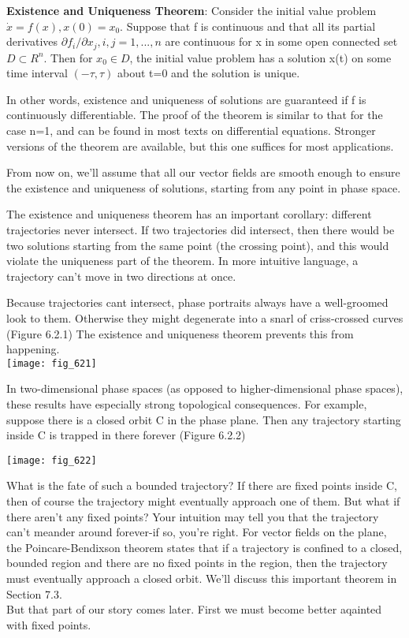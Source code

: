 \documentclass{article}
\newcommand\tab[1][1cm]{\hspace*{#1}}
\begin{document}
\textbf{Existence and Uniqueness Theorem}: Consider the initial value problem $\dot{x}=f(x), x(0)=x_{0}$. Suppose that f is continuous and that all its partial derivatives $\partial f_{i}/\partial x_{j}, i, j=1,...,n$ are continuous for x in some open connected set $D \subset R^{n}$. Then for $x_{0} \in D$, the initial value problem has a solution x(t) on some time interval $(-\tau , \tau)$ about t=0 and the solution is unique. \\ \tab

In other words, existence and uniqueness of solutions are guaranteed if f is continuously differentiable. The proof of the theorem is similar to that for the case n=1, and can be found in most texts on differential equations. Stronger versions of the theorem are available, but this one suffices for most applications. \\ \tab

From now on, we'll assume that all our vector fields are smooth enough to ensure the existence and uniqueness of solutions, starting from any point in phase space. \\ \tab

The existence and uniqueness theorem has an important corollary: different trajectories never intersect. If two trajectories did intersect, then there would be two solutions starting from the same point (the crossing point), and this would violate the uniqueness part of the theorem. In more intuitive language, a trajectory can't move in two directions at once. \\ \tab

Because trajectories cant intersect, phase portraits always have a well-groomed look to them. Otherwise they might degenerate into a snarl of criss-crossed curves (Figure 6.2.1) The existence and uniqueness theorem prevents this from happening.
\\
\texttt{[image: fig\_621]}

In two-dimensional phase spaces (as opposed to higher-dimensional phase spaces), these results have especially strong topological consequences. For example, suppose there is a closed orbit C in the phase plane. Then any trajectory starting inside C is trapped in there forever (Figure 6.2.2)

\texttt{[image: fig\_622]}

What is the fate of such a bounded trajectory? If there are fixed points inside C, then of course the trajectory might eventually approach one of them. But what if there aren't any fixed points? Your intuition may tell you that the trajectory can't meander around forever-if so, you're right. For vector fields on the plane, the Poincare-Bendixson theorem states that if a trajectory is confined to a closed, bounded region and there are no fixed points in the region, then the trajectory must eventually approach a closed orbit. We'll discuss this important theorem in Section 7.3. \\ \tab 
But that part of our story comes later. First we must become better aqainted with fixed points.
\end{document}
